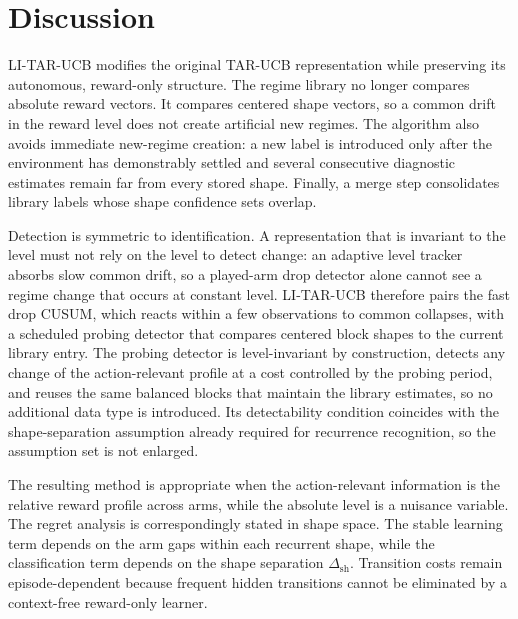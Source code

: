 \documentclass[11pt]{article}
\begin{document}
\section{Discussion}
\label{sec:discussion}

LI-TAR-UCB modifies the original TAR-UCB representation while preserving its autonomous, reward-only structure. The regime library no longer compares absolute reward vectors. It compares centered shape vectors, so a common drift in the reward level does not create artificial new regimes. The algorithm also avoids immediate new-regime creation: a new label is introduced only after the environment has demonstrably settled and several consecutive diagnostic estimates remain far from every stored shape. Finally, a merge step consolidates library labels whose shape confidence sets overlap.

Detection is symmetric to identification. A representation that is invariant to the level must not rely on the level to detect change: an adaptive level tracker absorbs slow common drift, so a played-arm drop detector alone cannot see a regime change that occurs at constant level. LI-TAR-UCB therefore pairs the fast drop CUSUM, which reacts within a few observations to common collapses, with a scheduled probing detector that compares centered block shapes to the current library entry. The probing detector is level-invariant by construction, detects any change of the action-relevant profile at a cost controlled by the probing period, and reuses the same balanced blocks that maintain the library estimates, so no additional data type is introduced. Its detectability condition coincides with the shape-separation assumption already required for recurrence recognition, so the assumption set is not enlarged.

The resulting method is appropriate when the action-relevant information is the relative reward profile across arms, while the absolute level is a nuisance variable. The regret analysis is correspondingly stated in shape space. The stable learning term depends on the arm gaps within each recurrent shape, while the classification term depends on the shape separation $\Delta_{\mathrm{sh}}$. Transition costs remain episode-dependent because frequent hidden transitions cannot be eliminated by a context-free reward-only learner.
\end{document}

